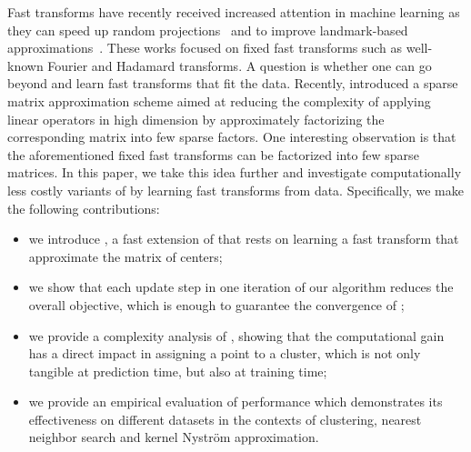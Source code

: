 Fast transforms have recently received increased attention in machine learning as they can speed up random projections~\cite{le2013fastfood,gittens2016revisiting} and to improve landmark-based approximations~\cite{si2016computationally}.
%
These works focused on fixed fast transforms such as well-known Fourier and Hadamard transforms.
A question is whether one can go beyond and learn fast transforms that fit the data. 
%
Recently, \citet{LeMagoarou2016Flexible} introduced a sparse matrix approximation scheme aimed  at  reducing the  complexity  of  applying  linear  operators  in  high  dimension by   approximately   factorizing   the   corresponding   matrix   into few   sparse   factors. 
One interesting observation is that the aforementioned fixed fast transforms can be factorized into few sparse matrices.
%
In this paper, we take this idea further and investigate computationally less costly variants of \kmeans by learning fast transforms from data.
%
Specifically, we make the following contributions:
\begin{itemize}
	\item we introduce \qkmeans, a fast extension of \kmeans that rests on learning a fast transform that approximate the matrix of centers;
	\item we show that each update step in one iteration of our algorithm  reduces the overall objective, which is enough to guarantee the convergence of \qkmeans;
	\item we provide a complexity analysis of \qkmeans, showing that the computational gain has a direct impact in assigning a point to a cluster, which is not only tangible at prediction time, but also at training time;
	\item we provide an empirical evaluation of \qkmeans  performance which demonstrates its effectiveness on different datasets in the contexts of clustering, nearest neighbor search and kernel Nystr\"om approximation.
\end{itemize}


